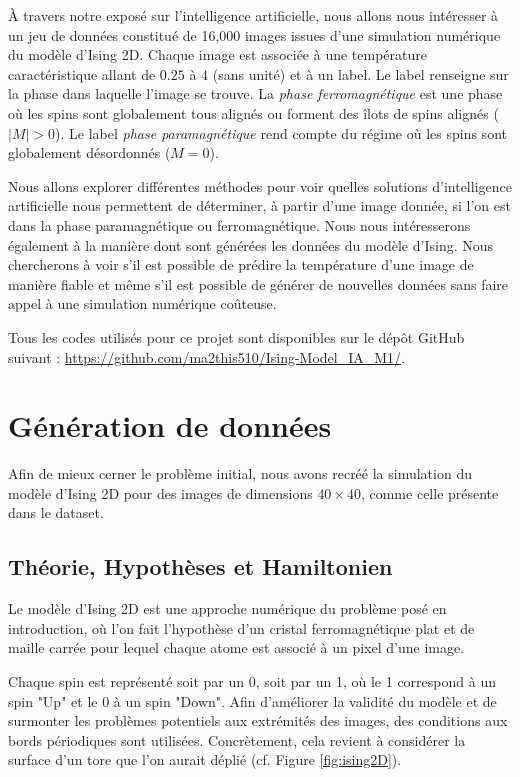 \documentclass[11pt, parskip=half]{scrartcl} %
\begin{document}
À travers notre exposé sur l'intelligence artificielle, nous allons nous intéresser à un jeu de données constitué de 16,000 images issues d'une simulation numérique du modèle d'Ising 2D. Chaque image est associée à une température caractéristique allant de $0.25$ à $4$ (sans unité) et à un label. Le label renseigne sur la phase dans laquelle l'image se trouve. La \textit{phase ferromagnétique} est une phase où les spins sont globalement tous alignés ou forment des îlots de spins alignés ($|M| > 0$). Le label \textit{phase paramagnétique} rend compte du régime où les spins sont globalement désordonnés ($M = 0$).

Nous allons explorer différentes méthodes pour voir quelles solutions d'intelligence artificielle nous permettent de déterminer, à partir d'une image donnée, si l'on est dans la phase paramagnétique ou ferromagnétique. Nous nous intéresserons également à la manière dont sont générées les données du modèle d'Ising. Nous chercherons à voir s'il est possible de prédire la température d'une image de manière fiable et même s'il est possible de générer de nouvelles données sans faire appel à une simulation numérique coûteuse.

Tous les codes utilisés pour ce projet sont disponibles sur le dépôt GitHub suivant : \url{https://github.com/ma2this510/Ising-Model_IA_M1/}.

\newpage
\section{Génération de données}

Afin de mieux cerner le problème initial, nous avons recréé la simulation du modèle d'Ising 2D pour des images de dimensions $40 \times 40$, comme celle présente dans le dataset.

\subsection{Théorie, Hypothèses et Hamiltonien}
Le modèle d'Ising 2D est une approche numérique du problème posé en introduction, où l'on fait l'hypothèse d'un cristal ferromagnétique plat et de maille carrée pour lequel chaque atome est associé à un pixel d'une image.

Chaque spin est représenté soit par un 0, soit par un 1, où le 1 correspond à un spin "Up" et le 0 à un spin "Down". Afin d'améliorer la validité du modèle et de surmonter les problèmes potentiels aux extrémités des images, des conditions aux bords périodiques sont utilisées. Concrètement, cela revient à considérer la surface d'un tore que l'on aurait déplié (cf. Figure \ref{fig:ising2D}).
\end{document}
